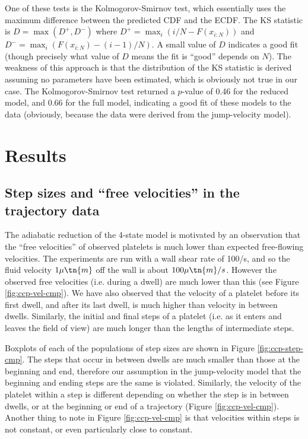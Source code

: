 One of these tests is the Kolmogorov-Smirnov test, which essentially
uses the maximum difference between the predicted CDF and the
ECDF. The KS statistic is $D = \max(D^+, D^-)$ where
$D^+ = \max_i(i/N - F(x_{i:N}))$ and
$D^- = \max_i(F(x_{i:N}) - (i - 1)/N)$. A small value of $D$ indicates
a good fit (though precisely what value of $D$ means the fit is
``good'' depends on $N$). The weakness of this approach is that the
distribution of the KS statistic is derived assuming no parameters
have been estimated, which is obviously not true in our case. The
Kolmogorov-Smirnov test returned a $p$-value of 0.46 for the reduced
model, and 0.66 for the full model, indicating a good fit of these
models to the data (obviously, because the data were derived from the
jump-velocity model).

\section{Results}
\label{sec:results-jump-velocity}

\subsection{Step sizes and ``free velocities'' in the trajectory data}
\label{sec:step-sizes-free}


The adiabatic reduction of the 4-state model is motivated by an
observation that the ``free velocities'' of observed platelets is much
lower than expected free-flowing velocities. The experiments are run
with a wall shear rate of 100/s, and so the fluid velocity $1 \mu\tn{m}$
off the wall is about $100 \mu\tn{m}/s$. However the observed free
velocities (i.e. during a dwell) are much lower than this (see Figure
\ref{fig:ccp-vel-cmp}). We have also observed that the velocity of a
platelet before its first dwell, and after its last dwell, is much
higher than velocity in between dwells. Similarly, the initial and final
steps of a platelet (i.e. as it enters and leaves the field of view) are
much longer than the lengths of intermediate steps.

Boxplots of each of the populations of step sizes are shown in Figure
\ref{fig:ccp-step-cmp}. The steps that occur in between dwells are much
smaller than those at the beginning and end, therefore our assumption in
the jump-velocity model that the beginning and ending steps are the same
is violated. Similarly, the velocity of the platelet within a step is
different depending on whether the step is in between dwells, or at the
beginning or end of a trajectory (Figure \ref{fig:ccp-vel-cmp}). Another
thing to note in Figure \ref{fig:ccp-vel-cmp} is that velocities within
steps is not constant, or even particularly close to constant.


